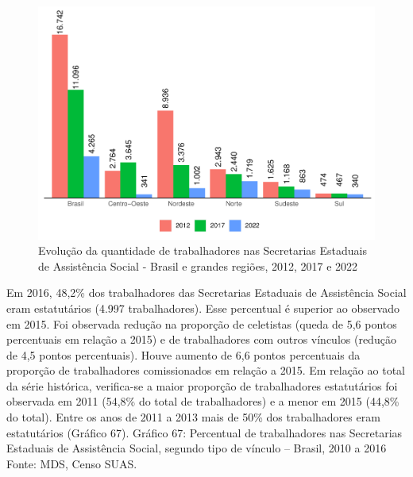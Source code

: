 \documentclass[
  brazilian]{report}
\begin{document}
\begin{figure}
\includegraphics{Censo-SUAS-2022_files/figure-latex/qtd-trab-uf-1} \caption[Evolução da quantidade de trabalhadores nas Secretarias Estaduais de Assistência Social - Brasil e grandes regiões, 2012, 2017 e 2022]{Evolução da quantidade de trabalhadores nas Secretarias Estaduais de Assistência Social - Brasil e grandes regiões, 2012, 2017 e 2022}\label{fig:qtd-trab-uf}
\end{figure}

Em 2016, 48,2\% dos trabalhadores das Secretarias Estaduais de
Assistência Social eram estatutários (4.997 trabalhadores). Esse
percentual é superior ao observado em 2015. Foi observada redução na
proporção de celetistas (queda de 5,6 pontos percentuais em relação a
2015) e de trabalhadores com outros vínculos (redução de 4,5 pontos
percentuais). Houve aumento de 6,6 pontos percentuais da proporção de
trabalhadores comissionados em relação a 2015. Em relação ao total da
série histórica, verifica-se a maior proporção de trabalhadores
estatutários foi observada em 2011 (54,8\% do total de trabalhadores) e
a menor em 2015 (44,8\% do total). Entre os anos de 2011 a 2013 mais de
50\% dos trabalhadores eram estatutários (Gráfico 67). Gráfico 67:
Percentual de trabalhadores nas Secretarias Estaduais de Assistência
Social, segundo tipo de vínculo -- Brasil, 2010 a 2016 Fonte: MDS, Censo
SUAS.
\end{document}
